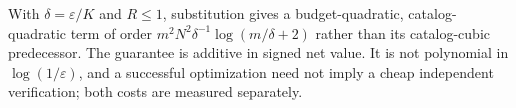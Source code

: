 With $\delta=\varepsilon/K$ and $R\leq1$, substitution gives a budget-quadratic, catalog-quadratic term of order $m^2N^2\delta^{-1}\log(m/\delta+2)$ rather than its catalog-cubic predecessor. The guarantee is additive in signed net value. It is not polynomial in $\log(1/\varepsilon)$, and a successful optimization need not imply a cheap independent verification; both costs are measured separately.
